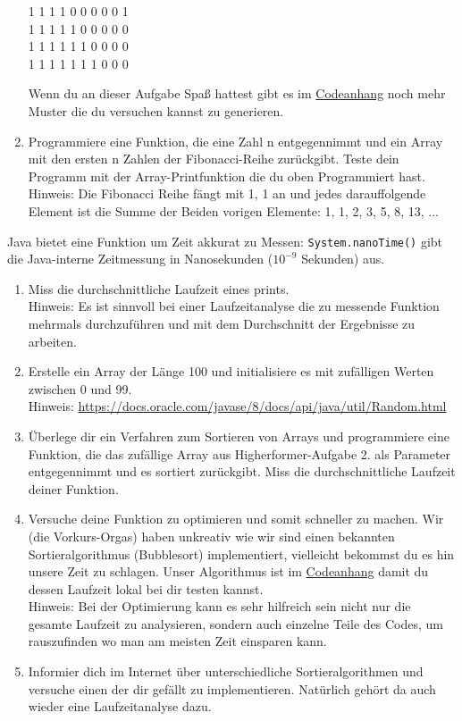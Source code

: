 \documentclass{../../sheet}
\begin{document}
\begin{enumerate}
\begin{ausgabe}
              1 1 1 1 0 0 0 0 0 1 \\
              1 1 1 1 1 0 0 0 0 0 \\
              1 1 1 1 1 1 0 0 0 0 \\
              1 1 1 1 1 1 1 0 0 0
          \end{ausgabe}
          Wenn du an dieser Aufgabe Spaß hattest gibt es im \hyperlink{Aufgabe_4}{Codeanhang} noch mehr Muster die du versuchen kannst zu generieren.
    \item Programmiere eine Funktion, die eine Zahl n entgegennimmt und ein Array mit den ersten n Zahlen der Fibonacci-Reihe zurückgibt. Teste dein Programm mit der Array-Printfunktion die du oben Programmiert hast.\\
          Hinweis: Die Fibonacci Reihe fängt mit 1, 1 an und jedes darauffolgende Element ist die Summe der Beiden vorigen Elemente: 1, 1, 2, 3, 5, 8, 13, ...

\end{enumerate}

\newpage
{}
Java bietet eine Funktion um Zeit akkurat zu Messen: \texttt{System.nanoTime()} gibt die Java-interne Zeitmessung in Nanosekunden ($10^{-9}$ Sekunden) aus.
\begin{enumerate}
    \item Miss die durchschnittliche Laufzeit eines prints.\\
    Hinweis: Es ist sinnvoll bei einer Laufzeitanalyse die zu messende Funktion mehrmals durchzuführen und mit dem Durchschnitt der Ergebnisse zu arbeiten.
    \item Erstelle ein Array der Länge 100 und initialisiere es mit zufälligen Werten zwischen 0 und 99.\\
          Hinweis: \url{https://docs.oracle.com/javase/8/docs/api/java/util/Random.html}
    \item Überlege dir ein Verfahren zum Sortieren von Arrays und programmiere eine Funktion, die das zufällige Array aus Higherformer-Aufgabe 2. als Parameter entgegennimmt und es sortiert zurückgibt. Miss die durchschnittliche Laufzeit deiner Funktion.          
    \item Versuche deine Funktion zu optimieren und somit schneller zu machen. Wir (die Vorkurs-Orgas) haben unkreativ wie wir sind einen bekannten Sortieralgorithmus (Bubblesort) implementiert, vielleicht bekommst du es hin unsere Zeit zu schlagen. Unser Algorithmus ist im \hyperlink{Highperformer}{Codeanhang} damit du dessen Laufzeit lokal bei dir testen kannst.\\
          Hinweis: Bei der Optimierung kann es sehr hilfreich sein nicht nur die gesamte Laufzeit zu analysieren, sondern auch einzelne Teile des Codes, um rauszufinden wo man am meisten Zeit einsparen kann.
    \item Informier dich im Internet über unterschiedliche Sortieralgorithmen und versuche einen der dir gefällt zu implementieren. Natürlich gehört da auch wieder eine Laufzeitanalyse dazu.
\end{enumerate}
\end{document}
